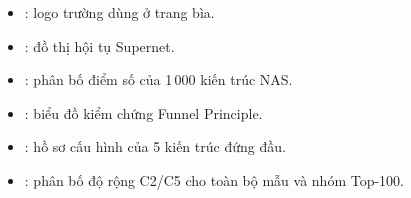 ﻿%
\begin{itemize}
  \item {}: logo trường dùng ở trang bìa.
  \item {}: đồ thị hội tụ Supernet.
  \item {}: phân bố điểm số của 1\,000 kiến trúc NAS.
  \item {}: biểu đồ kiểm chứng Funnel Principle.
  \item {}: hồ sơ cấu hình của 5 kiến trúc đứng đầu.
  \item {}: phân bố độ rộng C2/C5 cho toàn bộ mẫu và nhóm Top-100.
\end{itemize}

